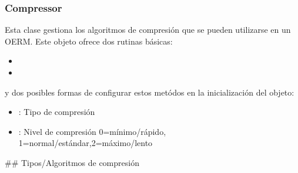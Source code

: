 \documentclass[a4paper,12pt,spanish]{sphinxmanual}
\begin{document}
\subsubsection{Compressor}
\label{\detokenize{openerm.Compressor:id1}}\label{\detokenize{openerm.Compressor::doc}}
Esta clase gestiona los algoritmos de compresión que se pueden utilizarse en un
{\hyperref[\detokenize{openerm.Database:module-openerm.Database}]{}} OERM. Este objeto ofrece dos rutinas básicas:
\begin{itemize}
\item {} 

\item {} 

\end{itemize}

y dos posibles formas de configurar estos metódos en la inicialización del
objeto:
\begin{itemize}
\item {} 
: Tipo de compresión

\item {} 
: Nivel de compresión  0=mínimo/rápido, 1=normal/estándar,2=máximo/lento

\end{itemize}

\#\# Tipos/Algoritmos de compresión
\end{document}
